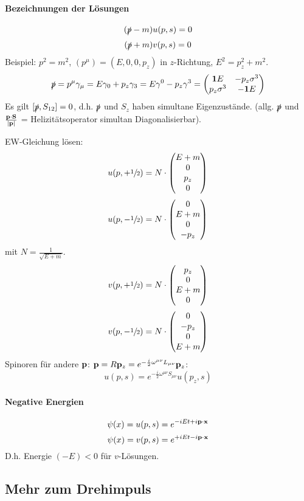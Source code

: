 \documentclass[11pt,a4paper]{report}
\begin{document}
\paragraph{Bezeichnungen der Lösungen}
$$(\slashed{p} - m)u(p,s)=0$$
$$(\slashed{p} + m)v(p,s)=0$$
Beispiel: $p^2 = m^2$, $(p^\mu )=(E,0,0,p_z)$ in $z$-Richtung, $E^2=p_z^2+m^2$.
$$\slashed{p} = p^\mu \gamma_\mu = E\gamma_0 + p_z\gamma_3 = E\gamma^0-p_z\gamma^3=\begin{pmatrix}
\mathbf{1}E & -p_z\sigma^3 \\ p_z\sigma^3 & -\mathbf{1}E
\end{pmatrix}$$
Es gilt $[\slashed{p} , S_{12}]=0$, d.h. $\slashed{p}$ und $S_z$ haben simultane Eigenzustände. (allg. $\slashed{p}$ und $\frac{\mathbf{p}\cdot\mathbf{S}}{|\mathbf{p}|}$ = Helizitätsoperator simultan Diagonalisierbar).\par 
EW-Gleichung lösen:
$$u(p,+\sfrac{1}{2})=N\cdot\begin{pmatrix}
E+m \\ 0 \\ p_z \\ 0
\end{pmatrix}$$
$$u(p,-\sfrac{1}{2})=N\cdot\begin{pmatrix}
0 \\E+m \\ 0 \\ -p_z 
\end{pmatrix}$$
mit $N=\frac{1}{\sqrt{E+m}}$.
$$v(p, +\sfrac{1}{2})=N\cdot\begin{pmatrix}
p_z \\ 0 \\ E+m \\ 0
\end{pmatrix}$$
$$v(p, -\sfrac{1}{2})=N\cdot\begin{pmatrix}
0 \\ -p_z \\ 0 \\ E+m
\end{pmatrix}$$
Spinoren für andere $\mathbf{p}$: $\mathbf{p}=R\mathbf{p}_z = e^{-\frac{i}{2}\omega^{\mu\nu}L_{\mu\nu}}\mathbf{p}_z$:
$$u(p,s)=e^{-\frac{i}{2}\omega^{\mu\nu}S_{\mu\nu}}u(p_z,s)$$
\paragraph{Negative Energien}
$$\psi (x)=u(p,s)=e^{-iEt+i\mathbf{p}\cdot\mathbf{x}}$$
$$\psi (x)=v(p,s)=e^{+iEt-i\mathbf{p}\cdot\mathbf{x}}$$
D.h. Energie $(-E)<0$ für $v$-Lösungen.

\subsection{Mehr zum Drehimpuls}
\end{document}
